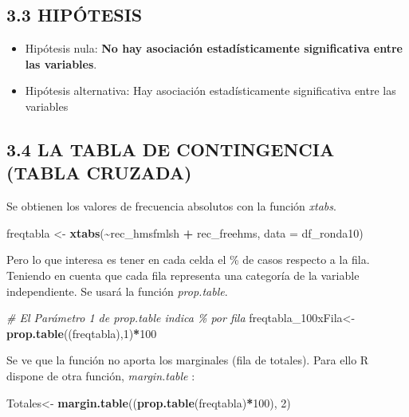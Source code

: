 \documentclass[
  12 pt,
  a4paper,
]{article}
\newenvironment{Shaded}{\begin{snugshade}}{\end{snugshade}}
\newcommand{\AttributeTok}[1]{\textcolor[rgb]{0.13,0.29,0.53}{#1}}
\newcommand{\CommentTok}[1]{\textcolor[rgb]{0.56,0.35,0.01}{\textit{#1}}}
\newcommand{\DecValTok}[1]{\textcolor[rgb]{0.00,0.00,0.81}{#1}}
\newcommand{\FunctionTok}[1]{\textcolor[rgb]{0.13,0.29,0.53}{\textbf{#1}}}
\newcommand{\NormalTok}[1]{#1}
\newcommand{\OtherTok}[1]{\textcolor[rgb]{0.56,0.35,0.01}{#1}}
\newcommand{\SpecialCharTok}[1]{\textcolor[rgb]{0.81,0.36,0.00}{\textbf{#1}}}
\providecommand{\tightlist}{%
  \setlength{\itemsep}{0pt}\setlength{\parskip}{0pt}}
\begin{document}
\subsection{3.3 HIPÓTESIS}\label{hipuxf3tesis-1}

\begin{itemize}
\tightlist
\item
  Hipótesis nula: \textbf{No hay asociación estadísticamente
  significativa entre las variables}.
\item
  Hipótesis alternativa: Hay asociación estadísticamente significativa
  entre las variables
\end{itemize}

\subsection{3.4 LA TABLA DE CONTINGENCIA (TABLA
CRUZADA)}\label{la-tabla-de-contingencia-tabla-cruzada}

Se obtienen los valores de frecuencia absolutos con la función
\emph{xtabs}.

\begin{Shaded}
\begin{Highlighting}[]
\NormalTok{freqtabla }\OtherTok{\textless{}{-}} \FunctionTok{xtabs}\NormalTok{(}\SpecialCharTok{\textasciitilde{}}\NormalTok{rec\_hmsfmlsh }\SpecialCharTok{+}\NormalTok{ rec\_freehms, }\AttributeTok{data =}\NormalTok{ df\_ronda10)}
\end{Highlighting}
\end{Shaded}

Pero lo que interesa es tener en cada celda el \% de casos respecto a la
fila. Teniendo en cuenta que cada fila representa una categoría de la
variable independiente. Se usará la función \emph{prop.table}.

\begin{Shaded}
\begin{Highlighting}[]
\CommentTok{\# El Parámetro 1 de prop.table indica  \% por fila}
\NormalTok{freqtabla\_100xFila}\OtherTok{\textless{}{-}}\FunctionTok{prop.table}\NormalTok{((freqtabla),}\DecValTok{1}\NormalTok{)}\SpecialCharTok{*}\DecValTok{100} 
\end{Highlighting}
\end{Shaded}

Se ve que la función no aporta los marginales (fila de totales). Para
ello R dispone de otra función, \emph{margin.table} :

\begin{Shaded}
\begin{Highlighting}[]
\NormalTok{Totales}\OtherTok{\textless{}{-}} \FunctionTok{margin.table}\NormalTok{((}\FunctionTok{prop.table}\NormalTok{(freqtabla)}\SpecialCharTok{*}\DecValTok{100}\NormalTok{), }\DecValTok{2}\NormalTok{)}
\end{Highlighting}
\end{Shaded}
\end{document}
